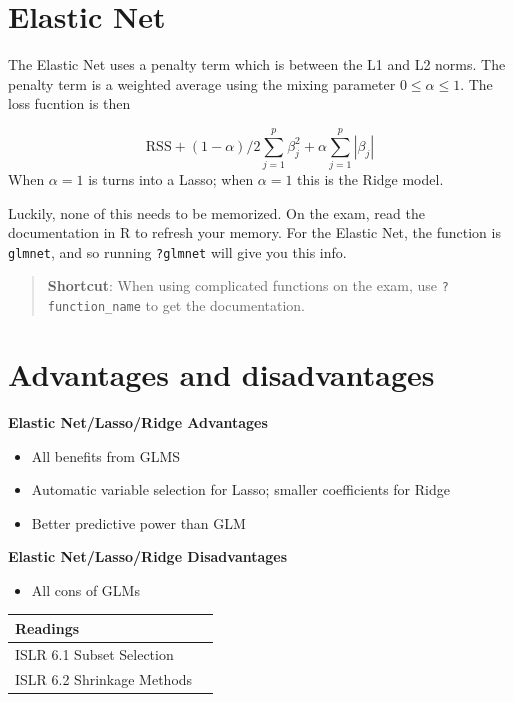 \documentclass[openany]{book}
\providecommand{\tightlist}{%
  \setlength{\itemsep}{0pt}\setlength{\parskip}{0pt}}
\begin{document}
\hypertarget{elastic-net}{%
\section{Elastic Net}\label{elastic-net}}

The Elastic Net uses a penalty term which is between the L1 and L2 norms. The penalty term is a weighted average using the mixing parameter \(0 \leq \alpha \leq 1\). The loss fucntion is then

\[\text{RSS} + (1 - \alpha)/2 \sum_{j = 1}^{p}\beta_j^2 + \alpha \sum_{j = 1}^p |\beta_j|\]
When \(\alpha = 1\) is turns into a Lasso; when \(\alpha = 1\) this is the Ridge model.

Luckily, none of this needs to be memorized. On the exam, read the documentation in R to refresh your memory. For the Elastic Net, the function is \texttt{glmnet}, and so running \texttt{?glmnet} will give you this info.

\begin{quote}
\textbf{Shortcut}: When using complicated functions on the exam, use \texttt{?function\_name} to get the documentation.
\end{quote}

\hypertarget{advantages-and-disadvantages-1}{%
\section{Advantages and disadvantages}\label{advantages-and-disadvantages-1}}

\textbf{Elastic Net/Lasso/Ridge Advantages}

\begin{itemize}
\tightlist
\item
  All benefits from GLMS
\item
  Automatic variable selection for Lasso; smaller coefficients for Ridge
\item
  Better predictive power than GLM
\end{itemize}

\textbf{Elastic Net/Lasso/Ridge Disadvantages}

\begin{itemize}
\tightlist
\item
  All cons of GLMs
\end{itemize}

\begin{longtable}[]{@{}ll@{}}
\toprule
Readings &\tabularnewline
\midrule
\endhead
ISLR 6.1 Subset Selection &\tabularnewline
ISLR 6.2 Shrinkage Methods &\tabularnewline
\bottomrule
\end{longtable}
\end{document}
